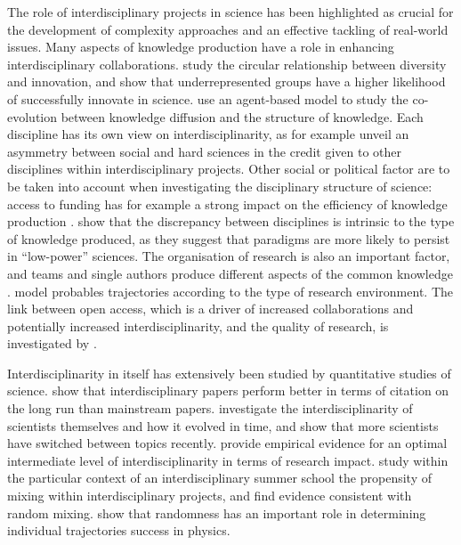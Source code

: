 \documentclass[utf8,11pt]{article}
\begin{document}
The role of interdisciplinary projects in science has been highlighted as crucial for the development of complexity approaches and an effective tackling of real-world issues. Many aspects of knowledge production have a role in enhancing interdisciplinary collaborations. \cite{Hofstra9284} study the circular relationship between diversity and innovation, and show that underrepresented groups have a higher likelihood of successfully innovate in science. \cite{jang2019coevolutionary} use an agent-based model to study the co-evolution between knowledge diffusion and the structure of knowledge. Each discipline has its own view on interdisciplinarity, as for example \cite{urbanska2019does} unveil an asymmetry between social and hard sciences in the credit given to other disciplines within interdisciplinary projects. Other social or political factor are to be taken into account when investigating the disciplinary structure of science: access to funding has for example a strong impact on the efficiency of knowledge production \cite{gross2019contest}. \cite{akerlof2018persistence} show that the discrepancy between disciplines is intrinsic to the type of knowledge produced, as they suggest that paradigms are more likely to persist in ``low-power'' sciences. The organisation of research is also an important factor, and teams and single authors produce different aspects of the common knowledge \cite{pavlidis2014together}. \cite{rouse2018modeling} model probables trajectories according to the type of research environment. The link between open access, which is a driver of increased collaborations and potentially increased interdisciplinarity, and the quality of research, is investigated by \cite{VANVLOKHOVEN2019751}.

Interdisciplinarity in itself has extensively been studied by quantitative studies of science. \cite{2019arXiv191003628T} show that interdisciplinary papers perform better in terms of citation on the long run than mainstream papers. \cite{zeng2019increasing} investigate the interdisciplinarity of scientists themselves and how it evolved in time, and show that more scientists have switched between topics recently. \cite{lariviere2010relationship} provide empirical evidence for an optimal intermediate level of interdisciplinarity in terms of research impact.%
\cite{brown_murray_furlong_coco_dablander_2020} study within the particular context of an interdisciplinary summer school the propensity of mixing within interdisciplinary projects, and find evidence consistent with random mixing. \cite{pluchino2019exploring} show that randomness has an important role in determining individual trajectories success in physics.
\end{document}
